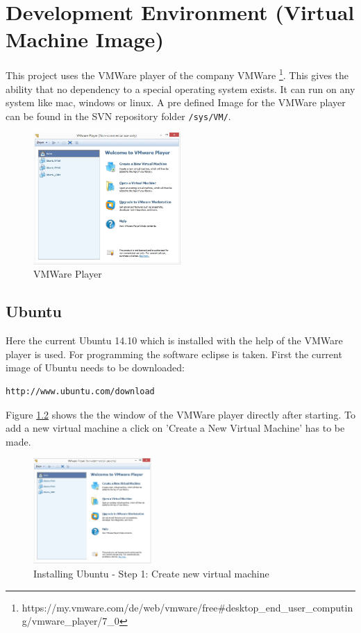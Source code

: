 \chapter{Development Environment (Virtual Machine Image)}
\label{sec:sec-VM}

This project uses the VMWare player of the company VMWare \footnote{https://my.vmware.com/de/web/vmware/free\#desktop\_end\_user\_computing/vmware\_player/7\_0}. This gives the ability that no dependency to a special operating system exists. It can run on any system like mac, windows or linux. A pre defined Image for the VMWare player can be found in the SVN repository folder \texttt{/sys/VM/}.

\begin{figure}[H]
	\centering\includegraphics[width=0.5\textwidth]{fig/Dev_Concept/VMPlayer.jpg}
	\caption{VMWare Player}
	\label{fig:VMPlayer}
\end{figure}

\section{Ubuntu}
\label{subsec:sec-Ub}

Here the current Ubuntu 14.10 which is installed with the help of the VMWare player is used. For programming the software eclipse is taken. First the current image of Ubuntu needs to be downloaded:
\begin{lstlisting}
http://www.ubuntu.com/download
\end{lstlisting}
Figure \ref{fig:Ub1} shows the the window of the VMWare player directly after starting. To add a new virtual machine a click on 'Create a New Virtual Machine' has to be made.

\begin{figure}[H]
	\centering\includegraphics[width=0.4\textwidth]{fig/Dev_Concept/Ub1.jpg}
	\caption{Installing Ubuntu - Step 1: Create new virtual machine}
	\label{fig:Ub1}
\end{figure}

